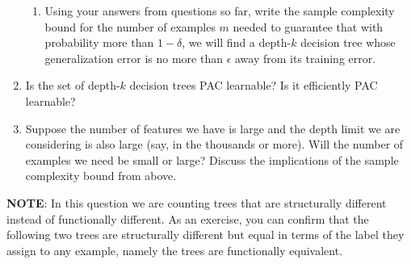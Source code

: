 \begin{enumerate}
\begin{enumerate}
  \item \relax[4 points] Using your answers from questions so far, write the
    sample complexity bound for the number of examples $m$ needed to guarantee
    that with probability more than $1- \delta$, we will find a depth-$k$
    decision tree whose generalization error is no more than $\epsilon$ away
    from its training error.

  \end{enumerate}

\item \relax[4 points] Is the set of depth-$k$ decision trees PAC learnable? Is
  it efficiently PAC learnable?

\item \relax[4 points] Suppose the number of features we have is large and the
  depth limit we are considering is also large (say, in the thousands or
  more). Will the number of examples we need be small or large? Discuss the
  implications of the sample complexity bound from above.
  
\end{enumerate}

\textbf{NOTE}: In this question we are counting trees that are structurally different instead of functionally different. As an exercise, you can confirm that the following two trees are structurally different but equal in terms of the label they assign to any example, namely the trees are functionally equivalent.


\begin{center}
  \end{center}


